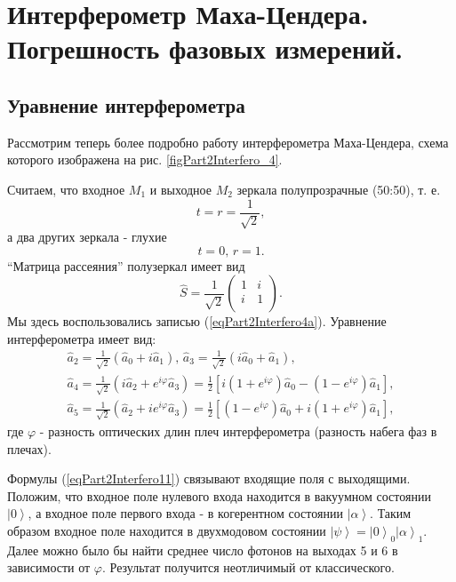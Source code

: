 \section{Интерферометр Маха-Цендера. Погрешность фазовых измерений.}
\subsection{Уравнение интерферометра}
Рассмотрим теперь более подробно работу интерферометра Маха-Цендера,
схема которого изображена на рис. \ref{figPart2Interfero_4}.



Считаем, что входное $M_1$ и выходное $M_2$ зеркала полупрозрачные
(50:50), т. е. 
\[
t = r = \frac{1}{\sqrt{2}},
\]
а два других зеркала - глухие
\[
t = 0, \, r = 1.
\]
``Матрица рассеяния'' полузеркал имеет вид 
\begin{equation}
\hat{S} = \frac{1}{\sqrt{2}} 
\left(
\begin{array}{cc}
1 & i \\
i & 1 \\
\end{array}
\right).
\nonumber
\end{equation}
Мы здесь воспользовались записью (\ref{eqPart2Interfero4a}). Уравнение
интерферометра имеет вид:
\begin{eqnarray}
\hat{a}_2 = \frac{1}{\sqrt{2}} \left(\hat{a}_0 + i \hat{a}_1\right),
\,
\hat{a}_3 = \frac{1}{\sqrt{2}} \left(i \hat{a}_0 + \hat{a}_1\right),
\nonumber \\
\hat{a}_4 = \frac{1}{\sqrt{2}} \left(i \hat{a}_2 + e^{i \varphi}
\hat{a}_3\right) = 
\frac{1}{2}\left[
i \left(1 + e^{i \varphi}\right)\hat{a}_0 -
\left(1 - e^{i \varphi}\right)\hat{a}_1
\right],
\nonumber \\
\hat{a}_5 = \frac{1}{\sqrt{2}} \left(\hat{a}_2 + i e^{i \varphi}
\hat{a}_3\right) = 
\frac{1}{2}\left[
\left(1 - e^{i \varphi}\right)\hat{a}_0 +
i \left(1 + e^{i \varphi}\right)\hat{a}_1
\right],
\label{eqPart2Interfero11}
\end{eqnarray}
где $\varphi$ - разность оптических длин плеч интерферометра (разность
набега фаз в плечах).

Формулы (\ref{eqPart2Interfero11}) связывают входящие поля с
выходящими. Положим, что входное поле нулевого входа находится в
вакуумном состоянии $\left|0\right>$, а входное поле первого входа - в
когерентном состоянии $\left|\alpha\right>$. Таким образом входное
поле находится в двухмодовом состоянии $\left|\psi\right> =
\left|0\right>_0\left|\alpha\right>_1$. Далее можно было бы найти
среднее число фотонов на выходах 5 и 6 в зависимости от
$\varphi$. Результат получится неотличимый от классического.

